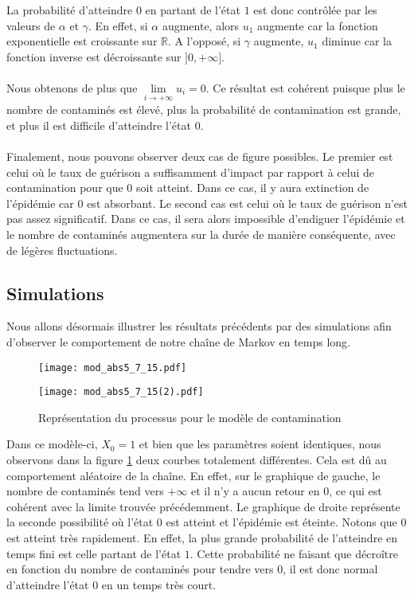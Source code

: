 \documentclass[12pt,a4paper]{report}
\theoremstyle{remark}
\begin{document}
La probabilité d'atteindre $0$ en partant de l'état $1$ est donc contrôlée par les valeurs de $\alpha$ et $\gamma$. En effet, si $\alpha$ augmente, alors $u_1$ augmente car la fonction exponentielle est croissante sur $\mathbb{R}$. A l'opposé, si $\gamma$ augmente, $u_1$ diminue car la fonction inverse est décroissante sur $]0,+\infty]$.
\\
\\
Nous obtenons de plus que $\lim\limits_{i \rightarrow +\infty} u_i = 0$. Ce résultat est cohérent puisque plus le nombre de contaminés est élevé, plus la probabilité de contamination est grande, et plus il est difficile d'atteindre l'état $0$.
\\
\\
Finalement, nous pouvons observer deux cas de figure possibles. Le premier est celui où le taux de guérison a suffisamment d'impact par rapport à celui de contamination pour que $0$ soit atteint. Dans ce cas, il y aura extinction de l'épidémie car $0$ est absorbant. Le second cas est celui où le taux de guérison n'est pas assez significatif. Dans ce cas, il sera alors impossible d'endiguer l'épidémie et le nombre de contaminés augmentera sur la durée de manière conséquente, avec de légères fluctuations.

\subsection{Simulations}
\vspace{0.6cm}

Nous allons désormais illustrer les résultats précédents par des simulations afin d'observer le comportement de notre chaîne de Markov en temps long.
\newpage
\begin{figure}[h]
    \begin{minipage}[c]{0.25\linewidth}
        \centering
        \texttt{[image: mod\_abs5\_7\_15.pdf]}
    \end{minipage}
    \hfill%
    \vspace{0.1cm}
    \begin{minipage}[c]{0.50\linewidth}
        \centering
       \texttt{[image: mod\_abs5\_7\_15(2).pdf]}
    \end{minipage}
    \caption{Représentation du processus pour le modèle de contamination}
    \label{modele_conta}
\end{figure} 

Dans ce modèle-ci, $X_0 =1$ et bien que les paramètres soient identiques, nous observons dans la figure \ref{modele_conta} deux courbes totalement différentes. Cela est dû au comportement aléatoire de la chaîne. En effet, sur le graphique de gauche, le nombre de contaminés tend vers $+\infty$ et il n'y a aucun retour en $0$, ce qui est cohérent avec la limite trouvée précédemment. Le graphique de droite représente la seconde possibilité où l'état $0$ est atteint et l'épidémie est éteinte. Notons que $0$ est atteint très rapidement. En effet, la plus grande probabilité de l'atteindre en temps fini est celle partant de l'état $1$. Cette probabilité ne faisant que décroître en fonction du nombre de contaminés pour tendre vers $0$, il est donc normal d'atteindre l'état $0$ en un temps très court.
\end{document}
